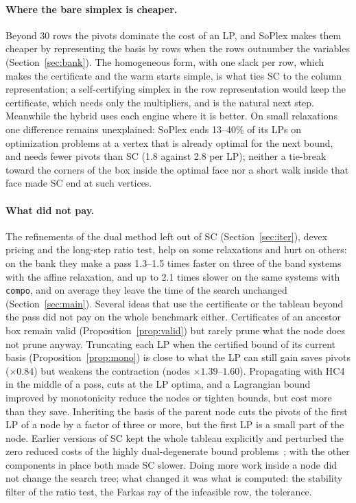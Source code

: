 \documentclass[11pt]{article}
\theoremstyle{definition}
\theoremstyle{remark}
\begin{document}
\paragraph{Where the bare simplex is cheaper.} Beyond 30 rows the pivots dominate the cost of
an LP, and SoPlex makes them cheaper by representing the basis by rows when
the rows outnumber the variables (Section~\ref{sec:bank}). The homogeneous
form, with one slack per row, which makes the certificate and the warm starts
simple, is what ties SC to the column representation; a self-certifying
simplex in the row representation would keep the certificate, which needs only
the multipliers, and is the natural next step. Meanwhile the hybrid uses each
engine where it is better. On small relaxations one difference remains
unexplained: SoPlex ends 13--40\% of its LPs on optimization problems at a
vertex that is already optimal for the next bound, and needs fewer pivots than
SC (1.8 against 2.8 per LP); neither a tie-break toward the corners of the box
inside the optimal face nor a short walk inside that face made SC end at such
vertices.

\paragraph{What did not pay.} The refinements of the dual method left out of
SC (Section~\ref{sec:iter}), devex pricing and the long-step ratio test, help
on some relaxations and hurt on others: on the bank they make a pass 1.3--1.5
times faster on three of the band systems with the affine relaxation, and up to
2.1 times slower on the same systems with \texttt{compo}, and on average they leave the time of the search unchanged
(Section~\ref{sec:main}). Several ideas that use the certificate or the
tableau beyond the pass did not pay on the whole benchmark either. Certificates of an
ancestor box remain valid (Proposition~\ref{prop:valid}) but rarely prune what
the node does not prune anyway. Truncating each LP when the certified bound of its current basis
(Proposition~\ref{prop:mono}) is close to what the LP can still gain saves
pivots ($\times0.84$) but weakens the contraction (nodes
$\times1.39$--$1.60$). Propagating with HC4 in the middle of a pass, cuts at
the LP optima, and a Lagrangian bound improved by monotonicity reduce the
nodes or tighten bounds, but cost more than they save. Inheriting the basis of
the parent node cuts the pivots of the first LP of a node by a factor of three
or more, but the first LP is a small part of the node. Earlier versions of SC
kept the whole tableau explicitly and perturbed the zero reduced costs of the
highly dual-degenerate bound problems~\cite{koberstein2005dual}; with the
other components in place both made SC slower. Doing more work inside a node
did not change the search tree; what changed it was what is computed: the
stability filter of the ratio test, the Farkas ray of the infeasible row, the
tolerance.
\end{document}
